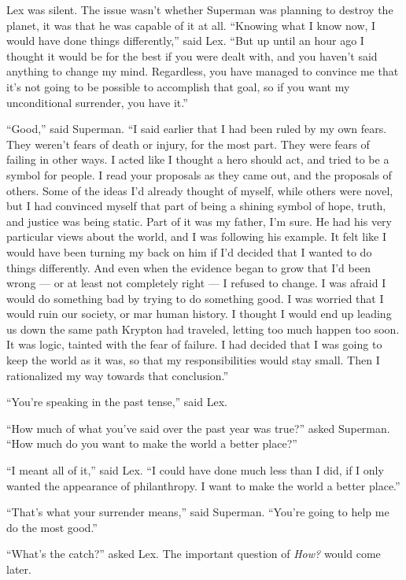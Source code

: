 Lex was silent. The issue wasn't whether Superman was planning to
destroy the planet, it was that he was capable of it at all. ``Knowing
what I know now, I would have done things differently,'' said Lex. ``But
up until an hour ago I thought it would be for the best if you were
dealt with, and you haven't said anything to change my mind. Regardless,
you have managed to convince me that it's not going to be possible to
accomplish that goal, so if you want my unconditional surrender, you
have it.''

``Good,'' said Superman. ``I said earlier that I had been ruled by my
own fears. They weren't fears of death or injury, for the most part.
They were fears of failing in other ways. I acted like I thought a hero
should act, and tried to be a symbol for people. I read your proposals
as they came out, and the proposals of others. Some of the ideas I'd
already thought of myself, while others were novel, but I had convinced
myself that part of being a shining symbol of hope, truth, and justice
was being static. Part of it was my father, I'm sure. He had his very
particular views about the world, and I was following his example. It
felt like I would have been turning my back on him if I'd decided that I
wanted to do things differently. And even when the evidence began to
grow that I'd been wrong --- or at least not completely right --- I
refused to change. I was afraid I would do something bad by trying to do
something good. I was worried that I would ruin our society, or mar
human history. I thought I would end up leading us down the same path
Krypton had traveled, letting too much happen too soon. It was logic,
tainted with the fear of failure. I had decided that I was going to keep
the world as it was, so that my responsibilities would stay small. Then
I rationalized my way towards that conclusion.''

``You're speaking in the past tense,'' said Lex.

``How much of what you've said over the past year was true?'' asked
Superman. ``How much do you want to make the world a better place?''

``I meant all of it,'' said Lex. ``I could have done much less than I
did, if I only wanted the appearance of philanthropy. I want to make the
world a better place.''

``That's what your surrender means,'' said Superman. ``You're going to
help me do the most good.''

``What's the catch?'' asked Lex. The important question of \emph{How?}
would come later.

